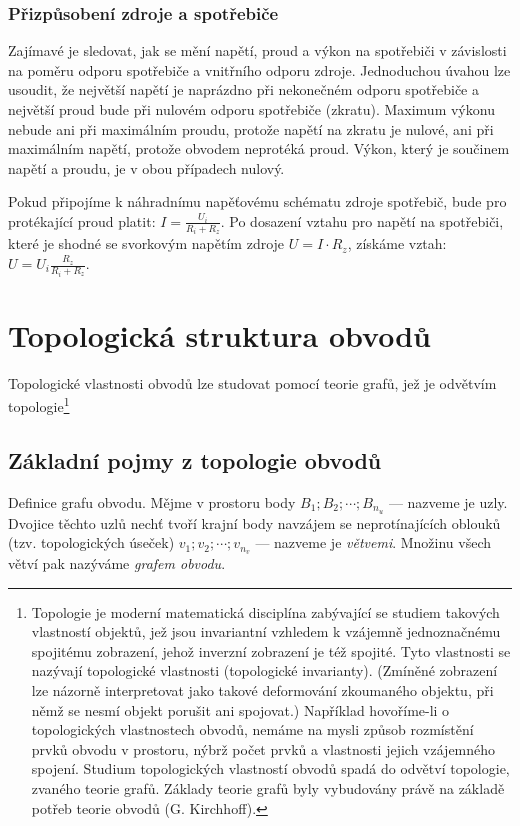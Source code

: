 {      \subsubsection{Přizpůsobení zdroje a spotřebiče}
        Zajímavé je sledovat, jak se mění napětí, proud a výkon na spotřebiči v závislosti na 
        poměru odporu spotřebiče a vnitřního odporu zdroje. Jednoduchou úvahou lze usoudit, že 
        největší napětí je naprázdno při nekonečném odporu spotřebiče a největší proud bude při 
        nulovém odporu spotřebiče (zkratu). Maximum výkonu nebude ani při maximálním proudu, 
        protože napětí na zkratu je nulové, ani při maximálním napětí, protože obvodem neprotéká 
        proud. Výkon, který je součinem napětí a proudu, je v obou případech nulový.
        
        Pokud připojíme k náhradnímu napěťovému schématu zdroje spotřebič, bude pro protékající 
        proud platit: \(I = \frac{U_i}{R_i + R_z}\). Po dosazení vztahu pro napětí na spotřebiči, 
        které je shodné se svorkovým napětím zdroje \(U=I\cdot R_z\), získáme vztah: \(U = 
        U_i\frac{R_z}{R_i + R_z}\).
        
  \section{Topologická struktura obvodů}
    Topologické vlastnosti obvodů lze studovat pomocí teorie grafů, jež je odvětvím 
    topologie\footnote{Topologie je moderní	matematická disciplína zabývající se studiem takových 
    vlastností objektů, jež jsou invariantní vzhledem k vzájemně jednoznačnému spojitému zobrazení, 
    jehož inverzní zobrazení je též spojité. Tyto vlastnosti se nazývají topologické vlastnosti 
    (topologické invarianty). (Zmíněné zobrazení lze názorně interpretovat jako takové deformování 
    zkoumaného objektu, při němž se nesmí objekt porušit ani spojovat.) Například hovoříme-li o 
    topologických vlastnostech obvodů, nemáme na mysli způsob rozmístění prvků obvodu v prostoru, 
    nýbrž počet prvků a vlastnosti jejich vzájemného spojení. Studium topologických vlastností 
    obvodů spadá do odvětví topologie, zvaného teorie grafů. Základy teorie grafů byly vybudovány 
    právě na základě potřeb teorie obvodů (G. Kirchhoff).}
    
    \subsection{Základní pojmy z topologie obvodů}
      Definice grafu obvodu. Mějme v prostoru body \(B_1; B_2;\cdots; B_{n_u}\) — nazveme je uzly. 
      Dvojice těchto uzlů nechť tvoří krajní body navzájem se neprotínajících oblouků (tzv. 
      topologických úseček) \(v_1; v_2; \cdots; v_{n_v}\) — nazveme je \emph{větvemi}. Množinu 
      všech větví pak nazýváme \emph{grafem obvodu}.
      
}
